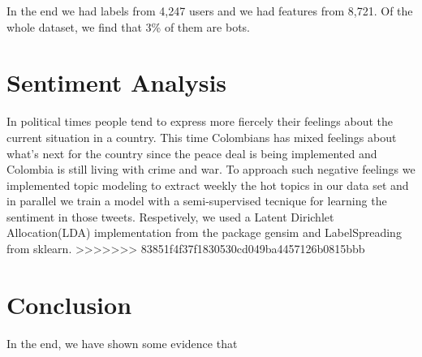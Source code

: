 \documentclass[10pt,a4paper]{article} %
\begin{document}
	In the end we had labels from 4,247 users and we had features from 8,721.  Of the whole dataset, we find that 3\% of them are bots.
		
	\section{Sentiment Analysis}
	In political times people tend to express more fiercely their feelings about the current situation in a country. This time Colombians has mixed feelings about what's next for the country since the peace deal is being implemented and Colombia is still living with crime and war. To approach such negative feelings we implemented topic modeling to extract weekly the hot topics in our data set and in parallel we train a model with a semi-supervised tecnique for learning the sentiment in those tweets. Respetively, we used a Latent Dirichlet Allocation(LDA) implementation from the package gensim and LabelSpreading from sklearn.
>>>>>>> 83851f4f37f1830530cd049ba4457126b0815bbb
	
	\section{Conclusion}
	
	In the end, we have shown some evidence that
	
	\nocite{*}
	
	
\end{document}
